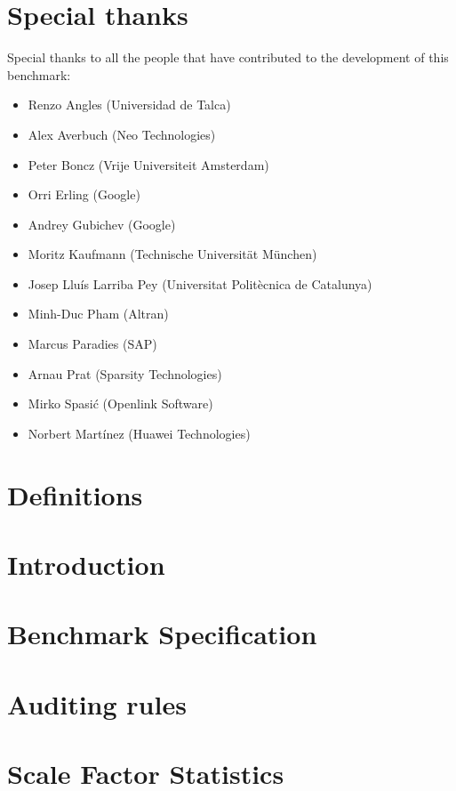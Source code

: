 \documentclass{ldbc}
\begin{document}
\maketitle

%

\chapter*{Special thanks}
Special thanks to all the people that have contributed to the development of
this benchmark:
\begin{itemize}
  \item Renzo Angles (Universidad de Talca)
  \item Alex Averbuch (Neo Technologies)
  \item Peter Boncz (Vrije Universiteit Amsterdam)
  \item Orri Erling (Google)
  \item Andrey Gubichev (Google)
  \item Moritz Kaufmann (Technische Universität München)
  \item Josep Llu\'is Larriba Pey (Universitat Polit\`ecnica de Catalunya)
  \item Minh-Duc Pham (Altran)
  \item Marcus Paradies (SAP)
  \item Arnau Prat (Sparsity Technologies)
  \item Mirko Spasi\'c (Openlink Software)
  \item Norbert Mart\'inez (Huawei Technologies)
\end{itemize}

\listoffigures
\listoftables
\chapter*{Definitions}


\chapter{Introduction}

\chapter{Benchmark Specification}


\chapter{Auditing rules}\label{chapter:auditing}


%




\appendix

\chapter{Scale Factor Statistics}

\end{document}

